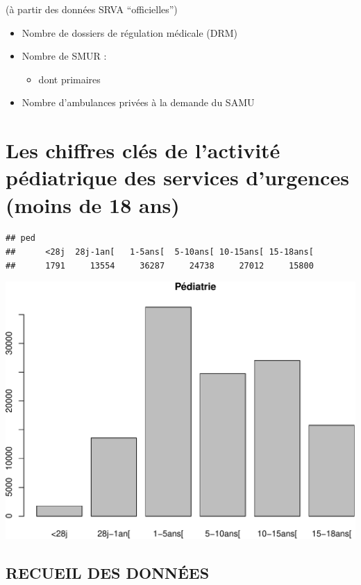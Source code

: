 \documentclass[]{article}
\begin{document}
(à partir des données SRVA ``officielles'')

\begin{itemize}
\itemsep1pt\parskip0pt
\item
  Nombre de dossiers de régulation médicale (DRM)
\item
  Nombre de SMUR :

  \begin{itemize}
  \itemsep1pt\parskip0pt
  \item
    dont primaires
  \end{itemize}
\item
  Nombre d'ambulances privées à la demande du SAMU
\end{itemize}

\section{Les chiffres clés de l'activité pédiatrique des services
d'urgences (moins de 18
ans)}\label{les-chiffres-cles-de-lactivite-pediatrique-des-services-durgences-moins-de-18-ans}

\begin{verbatim}
## ped
##      <28j  28j-1an[   1-5ans[  5-10ans[ 10-15ans[ 15-18ans[ 
##      1791     13554     36287     24738     27012     15800
\end{verbatim}

\includegraphics{rapport2014_V4_files/figure-latex/pop18-1.pdf}

\subsection{RECUEIL DES DONNÉES}\label{recueil-des-donnees-1}
\end{document}
